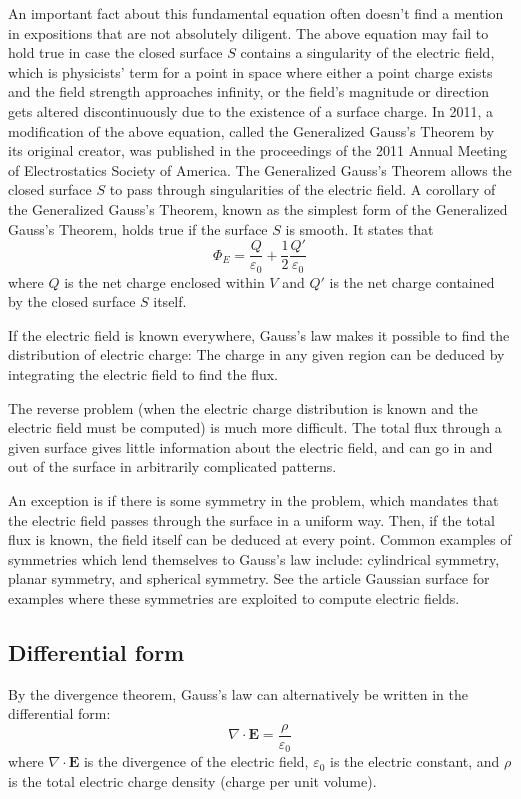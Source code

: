 \documentclass[a4paper]{article}
\begin{document}
An important fact about this fundamental equation often doesn't find a mention in expositions that are not absolutely diligent. The above equation may fail to hold true in case the closed surface \(S\) contains a singularity of the electric field, which is physicists' term for a point in space where either a point charge exists and the field strength approaches infinity, or the field's magnitude or direction gets altered discontinuously due to the existence of a surface charge. In 2011, a modification of the above equation, called the Generalized Gauss's Theorem by its original creator, was published in the proceedings of the 2011 Annual Meeting of Electrostatics Society of America. The Generalized Gauss's Theorem allows the closed surface \(S\) to pass through singularities of the electric field. A corollary of the Generalized Gauss's Theorem, known as the simplest form of the Generalized Gauss's Theorem, holds true if the surface \(S\) is smooth. It states that 
\[
    \Phi_E = \frac{Q}{\varepsilon_0} + \frac{1}{2} \frac{Q'}{\varepsilon_0}
\]
where \(Q\) is the net charge enclosed within \(V\) and \(Q'\) is the net charge contained by the closed surface \(S\) itself. 

If the electric field is known everywhere, Gauss's law makes it possible to find the distribution of electric charge: The charge in any given region can be deduced by integrating the electric field to find the flux.

The reverse problem (when the electric charge distribution is known and the electric field must be computed) is much more difficult. The total flux through a given surface gives little information about the electric field, and can go in and out of the surface in arbitrarily complicated patterns.

An exception is if there is some symmetry in the problem, which mandates that the electric field passes through the surface in a uniform way. Then, if the total flux is known, the field itself can be deduced at every point. Common examples of symmetries which lend themselves to Gauss's law include: cylindrical symmetry, planar symmetry, and spherical symmetry. See the article Gaussian surface for examples where these symmetries are exploited to compute electric fields. 

\subsection{Differential form}
By the divergence theorem, Gauss's law can alternatively be written in the differential form: 
\[
    \nabla \cdot \mathbf{E} = \frac{\rho}{\varepsilon_0}
\]
where \(\nabla \cdot \mathbf{E}\) is the divergence of the electric field, \(\varepsilon_0\) is the electric constant, and \(\rho\) is the total electric charge density (charge per unit volume).
\end{document}
